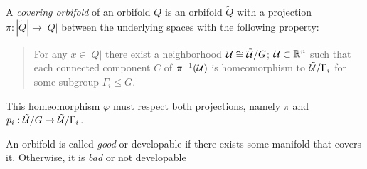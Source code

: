 \begin{defn}
A \emph{covering orbifold} of an orbifold $Q$ is an orbifold $\tilde{Q}$ with a projection $\pi:|\tilde{Q}|\rightarrow|Q|$ between the underlying spaces with the following property:
\begin{quote}
  For any $x\in |Q|$ there exist a neighborhood $\mathcal{U}\cong \tilde{\mathcal{U}}/G$; $\mathcal{U}\subset \mathbb{R}^n$ such
  that each connected component $C$ of $\pi^{-1}(\mathcal{U})$ is homeomorphism to $\tilde{\mathcal{U}}/\Gamma_i$
  for some subgroup $\Gamma_i\leqslant G$.
\end{quote}
\end{defn}
\begin{remark}
This homeomorphism $\varphi$ must respect both projections, namely $\pi$ and $p_i:\tilde{\mathcal{U}}/G\rightarrow\tilde{\mathcal{U}}/\Gamma_i$.

\vspace*{2cm}


\end{remark}

\begin{defn}
An orbifold is called \emph{good} or developable if there exists some manifold that covers it. Otherwise, it is \emph{bad} or not developable
\end{defn}



